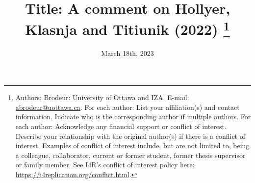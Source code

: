 \documentclass[12pt,a4paper]{article}
\begin{document}
\date{March 18th, 2023}

\title{Title: A comment on Hollyer, Klasnja and Titiunik (2022) \thanks{Authors: 
Brodeur: University of Ottawa and IZA. E-mail: \href{mailto:abrodeur@uottawa.ca}%
{abrodeur@uottawa.ca}. For each author: List your affiliation(s) and contact information. Indicate who is the corresponding author if multiple authors. For each author: Acknowledge any financial support or conflict of interest. Describe your relationship with the original author(s) if there is a conflict of interest. Examples of conflict of interest include, but are not limited to, being a colleague, collaborator, current or former student, former thesis supervisor or family member. See I4R’s conflict of interest policy here: \url{https://i4replication.org/conflict.html}.}}
\author{}

\maketitle
\end{document}
